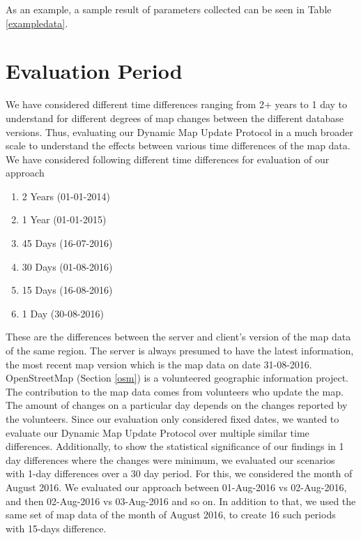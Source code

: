 As an example, a sample result of parameters collected can be seen in Table \ref{exampledata}.  





\section{Evaluation Period} \label{timedifference}
We have considered different time differences ranging from 2+ years to 1 day to understand for different degrees of map changes between the different database versions. Thus, evaluating our Dynamic Map Update Protocol in a much broader scale to understand the effects between various time differences of the map data. We have considered following different time differences for evaluation of our approach \begin{enumerate}
\item 2 Years (01-01-2014)
\item 1 Year (01-01-2015)
\item 45 Days (16-07-2016)
\item 30 Days (01-08-2016)
\item 15 Days (16-08-2016)
\item 1 Day (30-08-2016)
\end{enumerate}
These are the differences between the server and client's version of the map data of the same region. The server is always presumed to have the latest information, the most recent map version which is the map data on date 31-08-2016. 
\\

OpenStreetMap (Section \ref{osm}) is a volunteered geographic information project. The contribution to the map data comes from volunteers who update the map. The amount of changes on a particular day depends on the changes reported by the volunteers. Since our evaluation only considered fixed dates, we wanted to evaluate our Dynamic Map Update Protocol over multiple similar time differences. Additionally, to show the statistical significance of our findings in 1 day differences where the changes were minimum, we evaluated our scenarios with 1-day differences over a 30 day period. For this, we considered the month of August 2016. We evaluated our approach between 01-Aug-2016 vs 02-Aug-2016, and then 02-Aug-2016 vs 03-Aug-2016 and so on. In addition to that, we used the same set of map data of the month of August 2016, to create 16 such periods with 15-days difference. 


